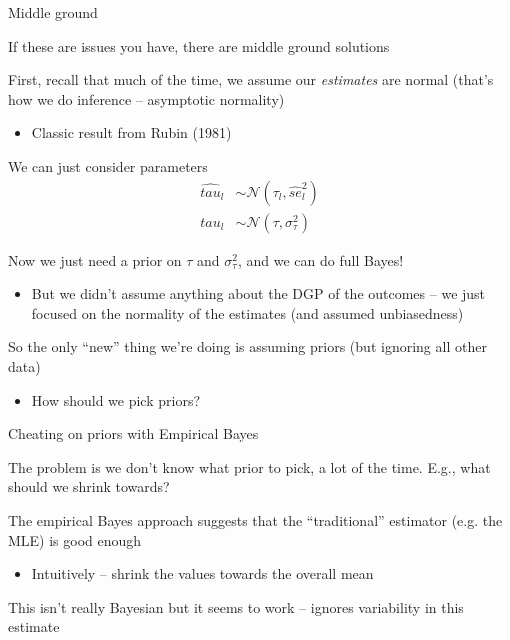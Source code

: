 \documentclass[notes,11pt, aspectratio=169]{beamer}
\newenvironment{wideitemize}{\itemize\addtolength{\itemsep}{10pt}}{\enditemize}
\begin{document}
\begin{frame}{Middle ground}
  \begin{wideitemize}
  \item If these are issues you have, there are middle ground solutions
  \item First, recall that much of the time, we assume our
    \emph{estimates} are normal (that's how we do inference --
    asymptotic normality)
    \begin{itemize}
    \item Classic result from Rubin (1981)
    \end{itemize}
  \item We can just consider parameters
    \begin{align*}
      \hat{tau}_{l} &\sim \mathcal{N}(\tau_{l}, \hat{se}_{l}^{2})\\
      tau_{l} &\sim \mathcal{N}(\tau, \sigma_{\tau}^{2})
    \end{align*}
  \item Now we just need a prior on $\tau$ and $\sigma_{\tau}^{2}$,
    and we can do full Bayes!
    \begin{itemize}
    \item But we didn't assume anything about the DGP of the outcomes
      -- we just focused on the normality of the estimates (and
      assumed unbiasedness)
    \end{itemize}
  \item So the only ``new'' thing we're doing is assuming priors (but
    ignoring all other data)
    \begin{itemize}
    \item How should we pick priors?
    \end{itemize}
  \end{wideitemize}
\end{frame}

\begin{frame}{Cheating on priors with Empirical Bayes}
  \begin{wideitemize}
  \item The problem is we don't know what prior to pick, a lot of the
    time. E.g., what should we shrink towards?
  \item The empirical Bayes approach suggests that the ``traditional'' estimator (e.g. the MLE) is good enough
    \begin{itemize}
    \item Intuitively -- shrink the values towards the overall mean
    \end{itemize}
  \item   This isn't really Bayesian but it seems to work -- ignores
  variability in this estimate
  \end{wideitemize}
\end{frame}
\end{document}
